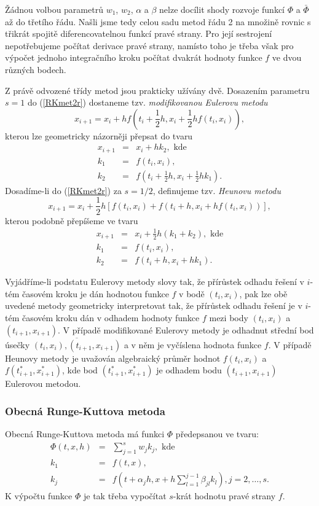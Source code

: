 \documentclass[a4paper, 12pt]{book}
\theoremstyle{definition}
\begin{document}
Žádnou volbou parametrů $w_1$, $w_2$, $\alpha$ a $\beta$ nelze docílit shody
rozvoje funkcí $\Phi$ a $\bar\Phi$ až do třetího řádu. Našli jsme tedy celou 
sadu metod řádu 2 na množině rovnic s třikrát spojitě diferencovatelnou funkcí 
pravé strany. Pro její sestrojení nepotřebujeme počítat derivace pravé strany,
namísto toho je třeba však pro výpočet jednoho integračního kroku počítat 
dvakrát hodnoty funkce $f$ ve dvou různých bodech.

Z právě odvozené třídy metod jsou prakticky užívány dvě. Dosazením parametru 
$s=1$ do (\ref{RKmet2r}) dostaneme tzv. {\em modifikovanou Eulerovu metodu}
\begin{equation}\label{modifEuler}
x_{i+1}=x_i + h f(t_i+\frac 12 h, x_i+\frac 12 hf(t_i,x_i)),
\end{equation}
kterou lze geometricky názorněji přepsat do tvaru
\begin{eqnarray*}
x_{i+1}&=&x_i + h k_2, \mbox{~kde}\\
k_1 &=& f(t_i,x_i),\\
k_2 &=& f(t_i+\frac 12 h, x_i+\frac 12 h k_1).
\end{eqnarray*}
Dosadíme-li do (\ref{RKmet2r}) za $s=1/2$, definujeme tzv. {\em Heunovu metodu}
\begin{equation}\label{Heun}
x_{i+1}=x_i + \frac 12h[f(t_i,x_i)+f(t_i+h, x_i+hf(t_i,x_i))],
\end{equation}
kterou podobně přepíšeme ve tvaru
\begin{eqnarray*}
x_{i+1}&=&x_i + \frac 12 h (k_1 + k_2), \mbox{~kde}\\
k_1 &=& f(t_i,x_i),\\
k_2 &=& f(t_i+h, x_i+h k_1).
\end{eqnarray*}


Vyjádříme-li podstatu Eulerovy metody slovy tak, že přírůstek odhadu řešení 
v $i$-tém časovém kroku je dán hodnotou funkce $f$ v bodě $(t_i,x_i)$, pak 
lze obě uvedené metody geometricky interpretovat tak, že přírůstek odhadu
řešení je v $i$-tém časovém kroku dán v odhadem hodnoty funkce $f$ mezi body
$(t_i,x_i)$ a $(t_{i+1}, x_{i+1})$. V případě modifikované Eulerovy metody je
odhadnut střední bod úsečky $\overline{(t_i,x_i),(t_{i+1}, x_{i+1})}$ a v něm
je vyčíslena hodnota funkce $f$. V případě Heunovy metody je uvažován 
algebraický průměr hodnot $f(t_i,x_i)$ a $f(t_{i+1}^*, x_{i+1}^*)$, kde
bod $(t_{i+1}^*, x_{i+1}^*)$ je odhadem bodu $(t_{i+1}, x_{i+1})$ Eulerovou
metodou.

\subsubsection{Obecná Runge-Kuttova metoda}
Obecná Runge-Kuttova metoda má funkci $\Phi$ předepsanou ve tvaru:
\begin{eqnarray*}
\Phi(t,x,h) &=& \sum_{j=1}^s w_jk_j,\mbox{~kde}\\
k_1 &=& f(t,x),\\
k_j &=& f\left(t+\alpha_j h, x+h\sum_{l=1}^{j-1}\beta_{jl}k_l\right), j=2,\dots,s.
\end{eqnarray*}
K výpočtu funkce $\Phi$ je tak třeba vypočítat $s$-krát hodnotu pravé strany $f$.
\end{document}
